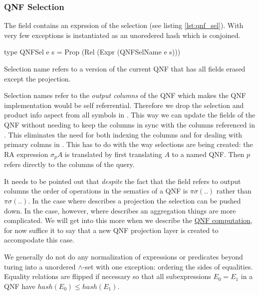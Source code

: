 \subsubsection{QNF Selection}

The  field contains an exprssion
of the selection (see listing \ref{lst:qnf_sel}). With very few
exceptions  is instantiated as an unoredered hash which
is conjoined.

\begin{code}
  \begin{haskellcode}
    type QNFSel e s = Prop (Rel (Expr (QNFSelName e s)))
  \end{haskellcode}
  \caption{\label{lst:qnf_sel}Selection name refers to a version of
    the current QNF that has all fields erased except the projection.}
\end{code}

Selection names refer to the \emph{output columns} of the QNF which makes
the QNF implementation would be self referrential. Therefore we drop
the selection and product info aspect from all symbols in
. This way we can update the fields of the QNF without needing
to keep the columns in sync with the columns referenced in
. This eliminates the need for both indexing the columns and
for dealing with primary colmns in . This has to do with
the way selections are being created: the RA expression \(\sigma_p A\)
is translated by first translating \(A\) to a named QNF. Then \(p\)
refers directly to the columns of the query.

It needs to be pointed out that \emph{despite} the fact that the
 field refers to output columns the order of operations
in the sematics of a QNF is \(\pi\sigma(..)\) rather than
\(\pi\sigma(..)\). In the case where  describes a
projection the selection can be pushed down. In the case, however,
where  describes an aggregation things are more
complicated. We will get into this more when we describe the
\hyperref[sec:org3f1036f]{QNF computation}, for now suffice it to say
that a new QNF projection layer is created to accompodate this case.

We generally do not do any normalization of expressions or predicates
beyond turing  into a unordered \(\land\)-set with one
exception: ordering the sides of equalities. Equality relations are
flipped if necessary so that all subexpressions \(E_0 = E_1\) in a QNF
have \(hash(E_0) \le hash(E_1)\).


